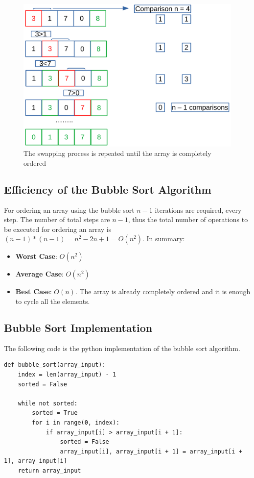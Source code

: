 \begin{figure}[H]
	\begin{center}
		\includegraphics[scale=.6]{chapters/searchandsorting/images/sorting_5.pdf}
		\caption[The swapping process is repeated until the array is completely ordered]{The swapping process is repeated until the array is completely ordered}
		\label{sorting_5}
	\end{center}
\end{figure}

\subsection{Efficiency of the Bubble Sort Algorithm}
For ordering an array using the bubble sort \(n - 1\) iterations are required, every step. The number of total steps are \(n - 1\), thus the total number of operations to be executed for ordering an array is \((n - 1)*(n - 1) = n^{2} - 2n + 1 = O(n^{2})\).
In summary:
\begin{itemize}
\item \textbf{Worst Case}: \(O(n^{2})\)
\item \textbf{Average Case}: \(O(n^{2})\)
\item \textbf{Best Case}: \(O(n)\). The array is already completely ordered and it is enough to cycle all the elements.
\end{itemize} 

\subsection{Bubble Sort Implementation}
The following code is the python implementation of the bubble sort algorithm.
\begin{lstlisting}[firstnumber=1, caption={Bubble Sort python implementation}]
def bubble_sort(array_input):
	index = len(array_input) - 1
	sorted = False
	
	while not sorted:
		sorted = True
		for i in range(0, index):
			if array_input[i] > array_input[i + 1]:
				sorted = False
				array_input[i], array_input[i + 1] = array_input[i + 1], array_input[i]
	return array_input
\end{lstlisting}

